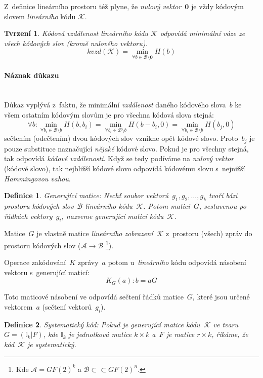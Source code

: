 \documentclass[thesis=M,czech,hidelinks]{FITthesis}[2012/06/26]
\newcommand{\0}{{\textcolor[gray]{0.75}{0}}}
\newtheorem{tvrzeni}{Tvrzení}
\newtheorem{definice}{Definice}
\begin{document}
Z~definice lineárního prostoru též plyne, že \emph{nulový vektor}~$\mathbf{0}$
je vždy kódovým slovem \emph{lineárního} kódu $\mathcal{K}$.

\begin{tvrzeni}
    Kódová vzdálenost lineárního kódu $\mathcal{K}$ odpovídá minimální váze ze
    všech kódových slov (kromě nulového vektoru).
    $$
        kvzd(\mathcal{K}) =
        \min_{\forall b \in \mathcal{B} \setminus \mathbf{0}} H(b)
    $$
\end{tvrzeni}
\paragraph{Náznak důkazu} \hfil \\
Důkaz vyplývá z~faktu, že minimální \emph{vzdálenost} daného kódového slova~$b$
ke všem ostatním kódovým slovům je pro všechna kódová slova stejná:
$$
    \forall b :
    \min_{\forall b_i \in \mathcal{B} \setminus b} H( b,     b_i ) =
    \min_{\forall b_i \in \mathcal{B} \setminus b} H( b-b_i, 0   ) =
    \min_{\forall b_i \in \mathcal{B} \setminus b} H( b_j,   0   )
$$
sečtením (odečtením) dvou kódových slov vznikne opět kódové slovo. Proto~$b_j$
je pouze substituce naznačující \emph{nějaké} kódové slovo. Pokud je pro všechny
stejná, tak odpovídá \emph{kódové vzdálenosti}. Když se tedy podíváme na
\emph{nulový vektor} (kódové slovo), tak nejbližší kódové slovo odpovídá
kódovému slovu s~nejnižší \emph{Hammingovou vahou}.


\begin{definice}{Generující matice:}
    Nechť soubor vektorů~$g_1,g_2,\ldots,g_k$ tvoří bázi prostoru
    kódových slov~$\mathcal{B}$ \emph{lineárního kódu}~$\mathcal{K}$. Potom
    matici~$G$, sestavenou po řádkách vektory~$g_i$, nazveme \emph{generující
    maticí} kódu~$\mathcal{K}$.
\end{definice}

Matice~$G$ je vlastně matice \emph{lineárního zobrazení}~$\mathcal{K}$
z~prostoru (všech) zpráv do prostoru kódových slov
($\mathcal{A} \to \mathcal{B}$ \footnote{
    Kde $\mathcal{A} = GF(2)^k$ a $\mathcal{B} \subset \subset GF(2)^n$.
}).

Operace zakódování~$K$ zprávy~$a$ potom u~\emph{lineárního} kódu odpovídá
násobení vektoru s~generující maticí:
$$ K_G(a) : b = aG $$

Toto maticové násobení ve odpovídá sečtení řádků matice~$G$, které
jsou určené vektorem~$a$ (sečtení vektorů~$g_i$).

\begin{definice}{Systematický kód:}
    Pokud je \emph{generující} matice kódu~$\mathcal{K}$ ve tvaru \\
    $G=(\mathbb{I}_k|F)$, kde $\mathbb{I}_k$ je jednotková matice $k \times k$
    a~$F$ je matice $r \times k$, říkáme, že kód~$\mathcal{K}$ je
    \emph{systematický}.
\end{definice}
\end{document}
